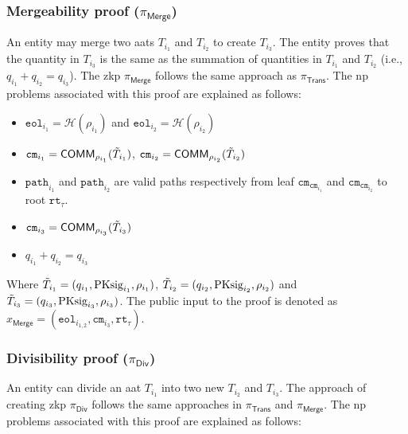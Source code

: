 \subsubsection{Mergeability proof ($\pi_\textsf{Merge}$)}
An entity may merge two \gls{aat}s $T_{i_1}$ and $T_{i_2}$ to create $T_{i_3}$. The entity proves that the quantity in $T_{i_3}$ is the same as the summation of quantities in $T_{i_1}$ and $T_{i_2}$ (i.e., $q_{i_1} + q_{i_2} = q_{i_3}$).  The \gls{zkp} $\pi_\mathsf{Merge}$ follows the same approach as $\pi_\mathsf{Trans}$. The \gls{np} problems associated with this proof are explained as follows:
\begin{itemize}
    \item $\texttt{eol}_{i_1} = \mathcal{H}(\rho_{i_1} )$ and $\texttt{eol}_{i_2} = \mathcal{H}(\rho_{i_2} )$
	\item $\texttt{cm}_{i_1} = \mathsf{COMM}_{\rho_{i_1}}(\Tilde{T}_{i_1})$, $\texttt{cm}_{i_2} = \mathsf{COMM}_{\rho_{i_2}}(\Tilde{T}_{i_2})$

	\item $\texttt{path}_{{i_1}}$ and $\texttt{path}_{{i_2}}$  are valid paths respectively from leaf  $\texttt{cm}_{\texttt{cm}_{i_1}}$  and 
      $\texttt{cm}_{\texttt{cm}_{i_2}}$ to root $\texttt{rt}_\tau$.

    \item $\texttt{cm}_{i_3} = \mathsf{COMM}_{\rho_{i_3}}(\Tilde{T}_{i_3})$
	\item $q_{i_1} + q_{i_2} = q_{i_3} $
    
\end{itemize}
Where  $\Tilde{T}_{i_1} = (q_{i_1}, \text{PKsig}_{i_1}, \rho_{i_1})$, $\Tilde{T}_{i_2} = (q_{i_2}, \text{PKsig}_{i_2}, \rho_{i_2})$ and $\Tilde{T}_{i_3} = (q_{i_3}, \text{PKsig}_{i_3}, \rho_{i_3})$.
The public input to the proof is denoted as $x_\mathsf{Merge} = (\texttt{eol}_{i_{1,2}}, \texttt{cm}_{i_3}, \texttt{rt}_\tau)$.


\subsubsection{Divisibility proof ($\pi_\textsf{Div}$)}
An entity can divide an \gls{aat} $T_{i_1}$ into two new ${T}_{i_2}$ and ${T}_{i_3}$. The approach of creating \gls{zkp} $\pi_\textsf{Div}$ follows the same approaches in $\pi_\textsf{Trans}$ and $\pi_\textsf{Merge}$. The \gls{np} problems associated with this proof are explained as follows:

